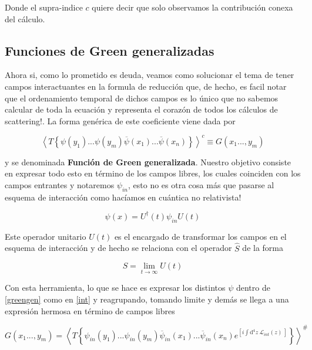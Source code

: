 \documentclass[tickz]{article}
\numberwithin{equation}{section}
\begin{document}
Donde el supra-indice $ c $ quiere decir que solo observamos la contribución
conexa del cálculo. 

\subsection{Funciones de Green generalizadas}\label{sec_green}

Ahora si, como lo prometido es deuda, veamos como solucionar el tema de tener campos interactuantes en la formula de reducción que, de hecho, es facil notar que el ordenamiento temporal de dichos campos es lo único que no sabemos calcular de toda la ecuación y representa el corazón de todos los cálculos de scattering!. La forma genérica de este coeficiente viene dada por

\begin{equation}\label{greengen}
\left\langle T\left\{ \psi(y_{1})...\psi(y_{m})\overline{\psi}(x_{1})...\overline{\psi}(x_{n})\right\} \right\rangle ^{c}\equiv G(x_{1}...,y_{m})
\end{equation}

y se denominada \textbf{Función de Green generalizada}. Nuestro objetivo consiste en expresar todo esto en término de los campos libres,
los cuales coinciden con los campos entrantes y notaremos $\psi_{in}$, esto no es otra cosa más que pasarse al esquema de interacción como
hacíamos en cuántica no relativista!

\begin{equation}\label{int}
\psi(x)=U^{\dagger}(t)\psi_{in}U(t)
\end{equation}

Este operador unitario $ U(t) $ es el encargado de transformar los campos en el esquema de interacción y de hecho se relaciona con el operador $ \hat{S}$ de la forma 

\begin{equation}\label{key}
S=\lim_{t\rightarrow \infty} U(t)
\end{equation}

Con esta herramienta, lo que se hace es expresar los distintos $ \psi $ dentro de \ref{greengen}  como en \ref{int}  y reagrupando, tomando limite y demás se llega a una expresión hermosa en término de campos libres

\begin{equation}\label{green_generalizado}
G(x_{1}...,y_{m})=\left\langle T\left\{ \psi_{in}(y_{1})...\psi_{in}(y_{m})\overline{\psi}_{in}(x_{1})...\overline{\psi}_{in}(x_{n})e^{\left[i\int \mathrm{d^4}z \ \mathcal{L}_{int}(z) \ \right]}\right\} \right\rangle ^{\#}
\end{equation}
\end{document}
